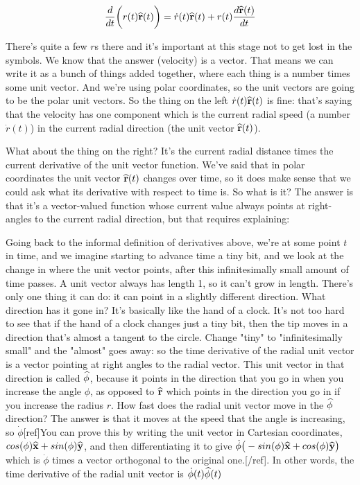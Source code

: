 \begin{align*}
\frac{d}{dt}\bigg(r(t)\mathbf{\widehat{r}}(t)\bigg) = \dot r(t) \mathbf{\widehat{r}}(t) + r(t)\frac{d \mathbf{\widehat{r}}(t)}{dt}
\end{align*}

There's quite a few $r$s there and it's important at this stage not to get lost
in the symbols. We know that the answer (velocity) is a vector. That means we
can write it as a bunch of things added together, where each thing is a number
times some unit vector. And we're using polar coordinates, so the unit vectors
are going to be the polar unit vectors. So the thing on the left $\dot r(t)
\mathbf{\widehat{r}}(t)$ is fine: that's saying that the velocity has one component which is
the current radial speed (a number $\dot r(t)$) in the current radial direction
(the unit vector $\mathbf{\widehat{r}}(t)$).

What about the thing on the right? It's the current radial distance times the
current derivative of the unit vector function. We've said that in polar
coordinates the unit vector $\mathbf{\widehat{r}}(t)$ changes over time, so it does make sense
that we could ask what its derivative with respect to time is. So what is it?
The answer is that it's a vector-valued function whose current value always
points at right-angles to the current radial direction, but that requires
explaining:

Going back to the informal definition of derivatives above, we're at some point
$t$ in time, and we imagine starting to advance time a tiny bit, and we look at
the change in where the unit vector points, after this infinitesimally small
amount of time passes. A unit vector always has length 1, so it can't grow in
length. There's only one thing it can do: it can point in a slightly different
direction. What direction has it gone in? It's basically like the hand of a
clock. It's not too hard to see that if the hand of a clock changes just a tiny
bit, then the tip moves in a direction that's almost a tangent to the
circle. Change "tiny" to "infinitesimally small" and the "almost" goes away: so
the time derivative of the radial unit vector is a vector pointing at right
angles to the radial vector. This unit vector in that direction is called
$\mathbf{\widehat{\phi}}$, because it points in the direction that you go in when you increase
the angle $\phi$, as opposed to $\mathbf{\widehat{r}}$ which points in the direction you go in
if you increase the radius $r$. How fast does the radial unit vector move in
the $\mathbf{\widehat{\phi}}$ direction? The answer is that it moves at the speed that the
angle is increasing, so $\dot \phi$[ref]You can prove this by writing the unit
vector in Cartesian coordinates, $cos(\phi) \mathbf{\widehat{x}} + sin(\phi) \mathbf{\widehat{y}}$, and then
differentiating it to give $\dot \phi\big(-sin(\phi)\mathbf{\widehat{x}} +
cos(\phi)\mathbf{\widehat{y}}\big)$ which is $\dot \phi$ times a vector orthogonal to the
original one.[/ref]. In other words, the time derivative of the radial unit
vector is $\dot \phi(t) \mathbf{\widehat{\phi}}(t)$

